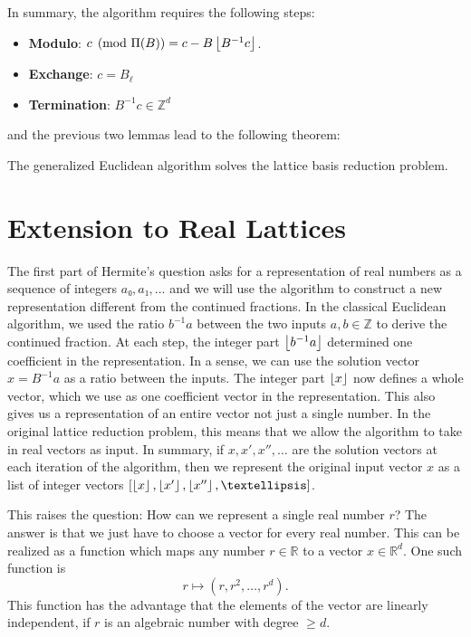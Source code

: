 In summary, the algorithm requires the following steps:
\begin{itemize}
  \item \textbf{Modulo}: $c \pmod{\Pi(B)} = c - B \left\lfloor B^{-1} c\right\rfloor$.
  \item \textbf{Exchange}: $c = B_ℓ$
  \item \textbf{Termination}: $B^{-1} c ∈ ℤ^d$
\end{itemize}
and the previous two lemmas lead to the following theorem:

\begin{theorem}
  The generalized Euclidean algorithm solves the lattice basis reduction problem.
\end{theorem}

\section{Extension to Real Lattices}

The first part of Hermite's question asks for a representation of real numbers
as a sequence of integers $a₀, a₁, …$ and we will use the algorithm to
construct a new representation different from the continued fractions.
In the classical Euclidean algorithm,
we used the ratio $b^{-1}a$ between the two inputs $a, b ∈ ℤ$ to derive the continued fraction.
At each step, the integer part $\left\lfloor b^{-1} a\right\rfloor$ determined one coefficient in
the representation.
In a sense, we can use the solution vector $x = B^{-1}a$ as a ratio between the inputs.
The integer part $\left\lfloor x\right\rfloor$ now defines a whole vector, which we use as
one coefficient vector in the representation.
This also gives us a representation of an entire vector not just a single number.
In the original lattice reduction problem, this means that we allow the
algorithm to take in real vectors as input.
In summary, if $x, x', x'', …$ are the solution vectors at each iteration of the algorithm,
then we represent the original input vector $x$ as a list of integer vectors $\left[\floor{x}, \floor{x'}, \floor{x''}, …\right]$.

This raises the question:
How can we represent a single real number $r$?
The answer is that we just have to choose a vector for every real number.
This can be realized as a function which maps any number $r ∈ ℝ$ to a vector $x ∈ ℝ^d$.
One such function is
\[
  r ↦ (r, r^2, …, r^d).
\]
This function has the advantage that the elements of the vector are linearly independent,
if $r$ is an algebraic number with degree $≥ d$.

